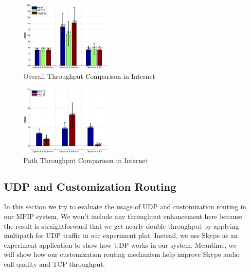 \begin{figure}[htb]
\centering
\includegraphics[width=0.8\linewidth,height=1.4in]{fig/emulab_tp_bar.eps}
\caption{Overall Throughput Comparison in Internet}
\label{fig.emulab_tp_bar}
\end{figure}


\begin{figure}[htb]
\centering
\includegraphics[width=0.8\linewidth,height=1.4in]{fig/emulab_patp_bar.eps}
\caption{Path Throughput Comparison in Internet}
\label{fig.emulab_patp_bar}
\end{figure}




\subsection{UDP and Customization Routing}
\label{sec:udp}

In this section we try to evaluate the usage of UDP and customization routing in our MPIP system. We won't include any throughput enhancement here because the result is straightforward that we get nearly double throughput by applying multipath for UDP traffic in our experiment plat. Instead, we use Skype\cite{skype} as an experiment application to show how UDP works in our system. Meantime, we will show how our customization routing mechanism help improve Skype audio call quality and TCP throughput.

